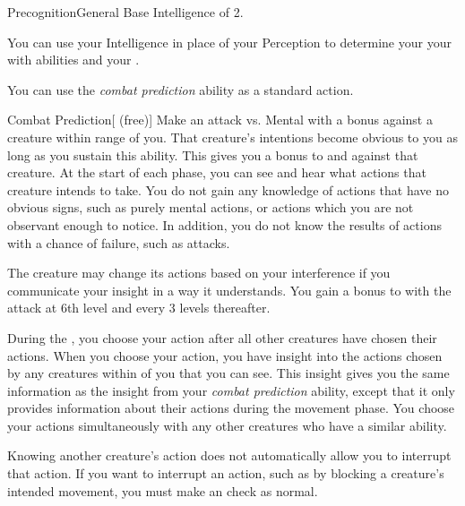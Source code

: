    \begin{feat}{Precognition}{General}
        \featpre Base Intelligence of 2.

         You can use your Intelligence in place of your Perception to determine your your  with  abilities and your .

         You can use the \textit{combat prediction} ability as a standard action.
        \begin{freeability}{Combat Prediction}[ (free)]
            Make an attack vs. Mental with a   bonus against a creature within \rngmed range of you.
            \hit That creature's intentions become obvious to you as long as you sustain this ability.
            This gives you a  bonus to  and  against that creature.
            At the start of each phase, you can see and hear what actions that creature intends to take.
            You do not gain any knowledge of actions that have no obvious signs, such as purely mental actions, or actions which you are not observant enough to notice.
            In addition, you do not know the results of actions with a chance of failure, such as attacks.

            The creature may change its actions based on your interference if you communicate your insight in a way it understands.
            \rankline
            You gain a  bonus to  with the attack at 6th level and every 3 levels thereafter.
        \end{freeability}

         During the , you choose your action after all other creatures have chosen their actions.
        When you choose your action, you have insight into the actions chosen by any creatures within \shortrange of you that you can see.
        This insight gives you the same information as the insight from your \textit{combat prediction} ability, except that it only provides information about their actions during the movement phase.
        You choose your actions simultaneously with any other creatures who have a similar ability.

        Knowing another creature's action does not automatically allow you to interrupt that action.
        If you want to interrupt an action, such as by blocking a creature's intended movement, you must make an  check as normal.


\end{feat}
